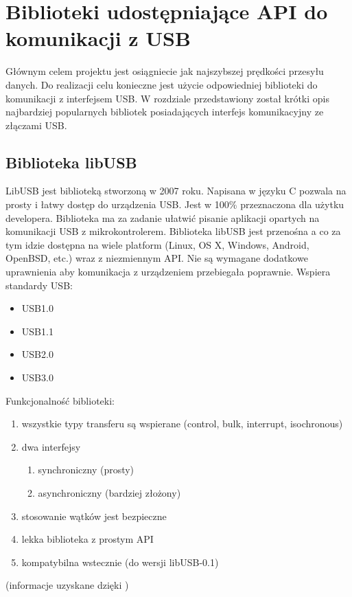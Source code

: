 \documentclass{BscUS}
\begin{document}
\chapter{Biblioteki udostępniające API do komunikacji z USB}
\label{librariesChapter}
Głównym celem projektu jest osiągniecie jak najszybszej prędkości przesyłu danych. Do realizacji celu konieczne jest użycie odpowiedniej biblioteki do komunikacji z interfejsem USB. W rozdziale przedstawiony został krótki opis najbardziej popularnych bibliotek posiadających interfejs komunikacyjny ze złączami USB.
\section{Biblioteka libUSB}
LibUSB jest biblioteką stworzoną w 2007 roku. Napisana w języku C  pozwala na prosty i łatwy dostęp do urządzenia USB. Jest w 100\% przeznaczona dla użytku developera. Biblioteka ma za zadanie ułatwić pisanie aplikacji opartych na komunikacji USB z mikrokontrolerem.
Biblioteka libUSB jest przenośna a co za tym idzie dostępna na wiele platform (Linux, OS X, Windows, Android, OpenBSD, etc.) wraz z niezmiennym API.
Nie są wymagane dodatkowe uprawnienia aby komunikacja z urządzeniem przebiegała poprawnie.
Wspiera standardy USB: 
\begin{itemize}
\item USB1.0 
\item USB1.1 
\item USB2.0 
\item USB3.0
\end{itemize}
Funkcjonalność biblioteki:
\begin{enumerate}
\item wszystkie typy transferu są wspierane (control, bulk, interrupt, isochronous)
\item dwa interfejsy
\begin{enumerate}
\item synchroniczny (prosty)
\item asynchroniczny (bardziej złożony)
\end{enumerate}
\item stosowanie wątków jest bezpieczne
\item lekka biblioteka z prostym API
\item kompatybilna wstecznie (do wersji libUSB-0.1)
\end{enumerate}
(informacje uzyskane dzięki \cite{libusbDesc})
\end{document}
